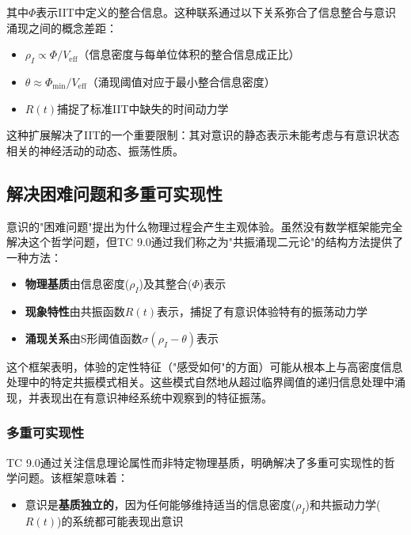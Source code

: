 \documentclass[12pt]{article}
\begin{document}
\begin{CJK}{UTF8}{gbsn}
其中$\Phi$表示IIT中定义的整合信息。这种联系通过以下关系弥合了信息整合与意识涌现之间的概念差距：

\begin{itemize}
    \item $\rho_I \propto \Phi / V_{\text{eff}}$（信息密度与每单位体积的整合信息成正比）
    \item $\theta \approx \Phi_{\text{min}} / V_{\text{eff}}$（涌现阈值对应于最小整合信息密度）
    \item $R(t)$捕捉了标准IIT中缺失的时间动力学
\end{itemize}

这种扩展解决了IIT的一个重要限制：其对意识的静态表示未能考虑与有意识状态相关的神经活动的动态、振荡性质。

\subsection{解决困难问题和多重可实现性}
意识的"困难问题"\cite{chalmers1995}提出为什么物理过程会产生主观体验。虽然没有数学框架能完全解决这个哲学问题，但TC 9.0通过我们称之为"共振涌现二元论"的结构方法提供了一种方法：

\begin{itemize}
    \item \textbf{物理基质}由信息密度($\rho_I$)及其整合($\Phi$)表示
    
    \item \textbf{现象特性}由共振函数$R(t)$表示，捕捉了有意识体验特有的振荡动力学
    
    \item \textbf{涌现关系}由S形阈值函数$\sigma(\rho_I - \theta)$表示
\end{itemize}

这个框架表明，体验的定性特征（"感受如何"的方面）可能从根本上与高密度信息处理中的特定共振模式相关。这些模式自然地从超过临界阈值的递归信息处理中涌现，并表现出在有意识神经系统中观察到的特征振荡。

\subsubsection{多重可实现性}
TC 9.0通过关注信息理论属性而非特定物理基质，明确解决了多重可实现性的哲学问题\cite{putnam1967}。该框架意味着：

\begin{itemize}
    \item 意识是\textbf{基质独立的}，因为任何能够维持适当的信息密度($\rho_I$)和共振动力学($R(t)$)的系统都可能表现出意识
    

\end{itemize}
\end{CJK}
\end{document}
